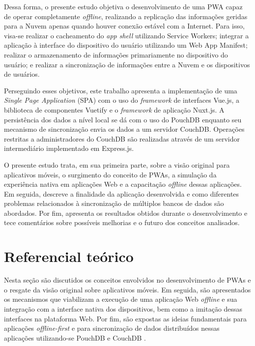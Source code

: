 \documentclass[
	article,			%
	11pt,				%
	oneside,			%
	a4paper,			%
	english,			%
	brazil,				%
	sumario=tradicional
	]{abntex2}
\begin{document}
Dessa forma, o presente estudo objetiva o desenvolvimento de uma PWA capaz de operar completamente \textit{offline}, realizando a replicação das informações geridas para a Nuvem apenas quando houver conexão estável com a Internet. Para isso, visa-se realizar o cacheamento do \textit{app shell} utilizando Service Workers; integrar a aplicação à interface do dispositivo do usuário utilizando um Web App Manifest; realizar o armazenamento de informações primariamente no dispositivo do usuário; e realizar a sincronização de informações entre a Nuvem e os dispositivos de usuários.

Perseguindo esses objetivos, este trabalho apresenta a implementação de uma \textit{Single Page Application} (SPA) com o uso do \textit{framework} de interfaces Vue.js, a biblioteca de componentes Vuetify e o \textit{framework} de aplicação Nuxt.js. A persistência dos dados a nível local se dá com o uso do PouchDB enquanto seu mecanismo de sincronização envia os dados a um servidor CouchDB. Operações restritas a administradores do CouchDB são realizadas através de um servidor intermediário implementado em Express.js.

O presente estudo trata, em sua primeira parte, sobre a visão original para aplicativos móveis, o surgimento do conceito de PWAs, a simulação da experiência nativa em aplicações Web e a capacitação \textit{offline} dessas aplicações. Em seguida, descreve a finalidade da aplicação desenvolvida e como diferentes problemas relacionados à sincronização de múltiplos bancos de dados são abordados. Por fim, apresenta os resultados obtidos durante o desenvolvimento e tece comentários sobre possíveis melhorias e o futuro dos conceitos analisados.


\section{Referencial teórico}

Nesta seção são discutidos os conceitos envolvidos no desenvolvimento de PWAs e o resgate da visão original sobre aplicativos móveis. Em seguida, são apresentados os mecanismos que viabilizam a execução de uma aplicação Web \textit{offline} e sua integração com a interface nativa dos dispositivos, bem como a imitação dessas interfaces na plataforma Web. Por fim, são expostas as ideias fundamentais para aplicações \textit{offline-first} e para sincronização de dados distribuídos nessas aplicações utilizando-se PouchDB \cite{pouchdb-2017} e CouchDB \cite{couchdb-2017}.
\end{document}
